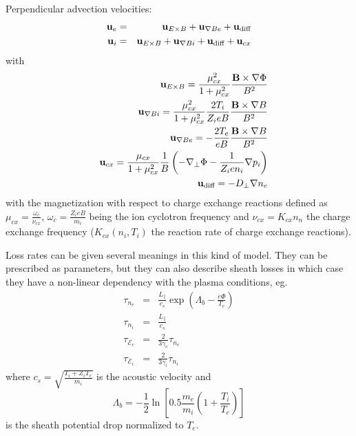 Perpendicular advection velocities:
\begin{eqnarray}
{\bf u}_e & = & {\bf u}_{E \times B} + {\bf u}_{\nabla B e} + 
{\bf u}_\textrm{diff}\\
{\bf u}_i & = & {\bf u}_{E \times B} + {\bf u}_{\nabla B i} + 
{\bf u}_\textrm{diff} + {\bf u}_{cx}
\end{eqnarray}
with
\begin{eqnarray}
& & {\bf u}_{E \times B} = \frac{\mu_{cx}^2}{1+\mu_{cx}^2} 
\frac{{\bf B} \times \nabla \Phi }{B^2} \\
& & {\bf u}_{\nabla B i} = \frac{\mu_{cx}^2}{1+\mu_{cx}^2} \frac{2 
T_i}{Z_i e B} \frac{{\bf B} \times \nabla B }{B^2} \\
& & {\bf u}_{\nabla B e} = -\frac{2 T_e}{e B} \frac{{\bf B} \times 
\nabla B }{B^2} \\
& & {\bf u}_{cx} =  \frac{\mu_{cx}}{1+\mu_{cx}^2} \frac{1}{B} \left( 
-\nabla_\perp \Phi -\frac{1}{Z_i e n_i} \nabla p_i \right) 
\\
& & {\bf u}_\textrm{diff} = - {D_\perp} \nabla n_e
\end{eqnarray}
with the magnetization with respect to charge exchange reactions 
defined as $\mu_{cx}=\frac{\omega_c}{\nu_{cx}}$, $\omega_c = \frac{Z_i 
e B}{m_i}$ being the ion cyclotron frequency and $\nu_{cx}=K_{cx} n_n$ 
the charge exchange frequency ($K_{cx} \left( n_i, T_i \right)$ the 
reaction rate of charge exchange reactions). 

Loss rates can be given several meanings in this kind of model. They 
can be prescribed as parameters, but they can also describe sheath 
losses in which case they have a non-linear dependency with the plasma 
conditions, eg.\ 
\begin{eqnarray}
\tau_{n_e} & = & \frac{L_\parallel}{c_s}\exp\left(\Lambda_b - \frac{e \Phi}{T_e}\right) \\
\tau_{n_i} & = & \frac{{L_\parallel}}{c_s} \\
\tau_{\mathcal{E}_e} & = & \frac{2}{3 {\gamma_e}} \tau_{n_e} \\
\tau_{\mathcal{E}_i} & = & \frac{2}{3 {\gamma_i}} \tau_{n_i}
\end{eqnarray}
where $c_s = \sqrt{\frac{T_i + {Z_i} T_e}{{m_i}}}$ 
is the acoustic velocity and
\begin{equation}
\Lambda_b=-\frac{1}{2} \ln \left[ 0.5 
{\frac{m_e}{m_i}} \left( 1 + \frac{T_i}{T_e} \right)
\right]
\end{equation}
is the sheath potential drop normalized to $T_e$.

